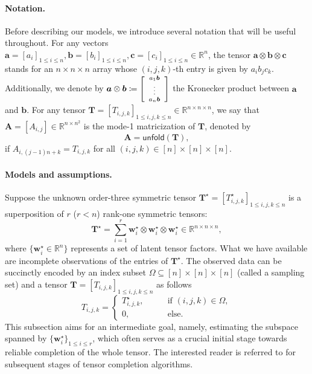 \paragraph{Notation.} Before describing our models, we introduce several notation that will be useful throughout. For any vectors $\bm{a}=[a_{i}]_{1\leq i\leq n},\bm{b}=[b_{i}]_{1\leq i\leq n},\bm{c}=[c_{i}]_{1\leq i\leq n}\in\mathbb{R}^{n}$,
the tensor $\bm{a}\otimes\bm{b}\otimes\bm{c}$ stands for an $n\times n\times n$
array whose $(i,j,k)$-th entry is given by $a_{i}b_{j}c_{k}$. Additionally, we denote by $\bm{a}\otimes \bm{b}\coloneqq  {\scriptsize \left[\begin{array}{c}
a_{1}\bm{b}\\
\vdots\\
a_{n}\bm{b}
\end{array}\right]}$ the Kronecker product between $\bm{a}$ and $\bm{b}$.  For any tensor $\bm{T}=[T_{i,j,k}]_{1\leq i,j,k\leq n}\in \mathbb{R}^{n\times n\times n}$, we say that $\bm{A}=[A_{i,j}]\in \mathbb{R}^{n\times n^2}$ is the mode-1 matricization of $\bm{T}$, denoted by $$\bm{A}=\mathsf{unfold}(\bm{T}),$$  if $A_{i,(j-1)n+k} = T_{i,j,k}$ for all $(i,j,k)\in [n]\times [n] \times [n]$.



\paragraph{Models and assumptions.}
Suppose the unknown order-three symmetric tensor $\bm{T}^{\star}=[T_{i,j,k}^{\star}]_{1\leq i,j,k\leq n}$  is a superposition of $r$ ($r<n$) rank-one symmetric tensors:
%
\begin{equation}
\bm{T}^{\star}=\sum_{i=1}^{r}\bm{w}_{i}^{\star}\otimes\bm{w}_{i}^{\star}\otimes\bm{w}_{i}^{\star} \in \mathbb{R}^{n\times n\times n},
\label{eq:defn-true-tensor}
\end{equation}
%
where $\{\bm{w}_i^{\star}\in \mathbb{R}^{n}\}$ represents a set of latent tensor factors.
What we have available are incomplete observations of the entries of  $\bm{T}^{\star}$. The observed data can be succinctly encoded by an index subset $\Omega \subseteq [n]\times [n] \times [n]$ (called a sampling set) and a tensor $\bm{T}=[T_{i,j,k}]_{1\leq i,j,k\leq n}$ as follows
%
\begin{equation}
T_{i,j,k}=\begin{cases}
T_{i,j,k}^{\star},\qquad & \text{if }(i,j,k)\in\Omega,\\
0, & \text{else}.
\end{cases}
\label{eq:observed-tensor-T}
\end{equation}
%
This subsection aims for an intermediate goal, namely, estimating the subspace spanned by $\{\bm{w}_i^{\star}\}_{1\leq i\leq r}$, which often serves as a crucial initial stage towards reliable completion of the whole tensor. The interested reader is referred to \citet{montanari2016spectral,cai2019tensorOR} for subsequent stages of tensor completion algorithms.


